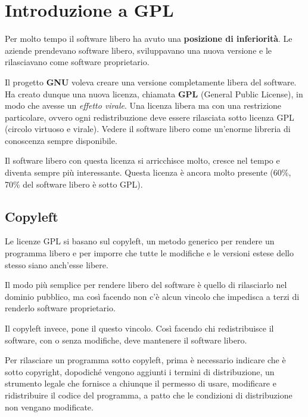 \section{Introduzione a GPL}

Per molto tempo il software libero ha avuto una \textbf{posizione di inferiorità}. Le aziende prendevano software libero, sviluppavano una nuova versione e le rilasciavano come software proprietario. 

Il progetto \textbf{GNU} voleva creare una versione completamente libera del software. Ha creato dunque una nuova licenza, chiamata \textbf{GPL} (General Public License), in modo che avesse un \textit{effetto virale}. Una licenza libera ma con una restrizione particolare, ovvero ogni redistribuzione deve essere rilasciata sotto licenza GPL (circolo virtuoso e virale). Vedere il software libero come un'enorme libreria di conoscenza sempre disponibile.

Il software libero con questa licenza si arricchisce molto, cresce nel tempo e diventa sempre più interessante. Questa licenza è ancora molto presente (60\%, 70\% del software libero è sotto GPL).

\subsection{Copyleft}

Le licenze GPL si basano sul copyleft, un metodo generico per rendere un programma libero e per imporre che tutte le modifiche e le versioni estese dello stesso siano anch'esse libere.

Il modo più semplice per rendere libero del software è quello di rilasciarlo nel dominio pubblico, ma così facendo non c'è alcun vincolo che impedisca a terzi di renderlo software proprietario.

Il copyleft invece, pone il questo vincolo. Così facendo chi redistribuisce il software, con o senza modifiche, deve mantenere il software libero.

Per rilasciare un programma sotto copyleft, prima è necessario indicare che è sotto copyright, dopodiché vengono aggiunti i termini di distribuzione, un strumento legale che fornisce a chiunque il permesso di usare, modificare e ridistribuire il codice del programma, a patto che le condizioni di distribuzione non vengano modificate.